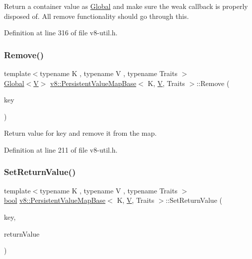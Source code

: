 Return a container value as \mbox{\hyperlink{classv8_1_1Global}{Global}} and make sure the weak callback is properly disposed of. All remove functionality should go through this. 

Definition at line 316 of file v8-\/util.\+h.

\mbox{\label{classv8_1_1PersistentValueMapBase_abd75a4c050416712167ba0bb9eace097}} 
\subsubsection{\texorpdfstring{Remove()}{Remove()}}
{\footnotesize\ttfamily template$<$typename K , typename V , typename Traits $>$ \\
\mbox{\hyperlink{classv8_1_1Global}{Global}}$<$\mbox{\hyperlink{classV}{V}}$>$ \mbox{\hyperlink{classv8_1_1PersistentValueMapBase}{v8\+::\+Persistent\+Value\+Map\+Base}}$<$ K, \mbox{\hyperlink{classV}{V}}, Traits $>$\+::Remove (\begin{DoxyParamCaption}\item[{const K \&}]{key }\end{DoxyParamCaption})\hspace{0.3cm}{\ttfamily [inline]}}

Return value for key and remove it from the map. 

Definition at line 211 of file v8-\/util.\+h.

\mbox{\label{classv8_1_1PersistentValueMapBase_a85201649d2bbd0ffdebe8be3d5c6447a}} 
\subsubsection{\texorpdfstring{Set\+Return\+Value()}{SetReturnValue()}}
{\footnotesize\ttfamily template$<$typename K , typename V , typename Traits $>$ \\
\mbox{\hyperlink{classbool}{bool}} \mbox{\hyperlink{classv8_1_1PersistentValueMapBase}{v8\+::\+Persistent\+Value\+Map\+Base}}$<$ K, \mbox{\hyperlink{classV}{V}}, Traits $>$\+::Set\+Return\+Value (\begin{DoxyParamCaption}\item[{const K \&}]{key,  }\item[{\mbox{\hyperlink{classv8_1_1ReturnValue}{Return\+Value}}$<$ \mbox{\hyperlink{classv8_1_1Value}{Value}} $>$}]{return\+Value }\end{DoxyParamCaption})\hspace{0.3cm}{\ttfamily [inline]}}

